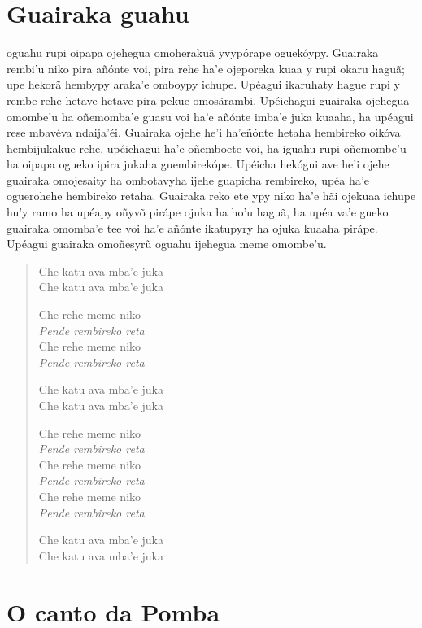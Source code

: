 \chapter{Guairaka guahu}

 oguahu rupi oipapa ojehegua omoherakuã yvypórape oguekóypy.
Guairaka rembi'u niko pira añónte voi, pira rehe ha'e ojeporeka kuaa y
rupi okaru haguã; upe hekorã hembypy araka'e omboypy ichupe. Upéagui
ikaruhaty hague rupi y rembe rehe hetave hetave pira pekue omosãrambi.
Upéichagui guairaka ojehegua omombe'u ha oñemomba'e guasu voi ha'e
añónte imba'e juka kuaaha, ha upéagui rese mbavéva ndaija'éi. Guairaka
ojehe he'i ha'eñónte hetaha hembireko oikóva hembijukakue rehe,
upéichagui ha'e oñemboete voi, ha iguahu rupi oñemombe'u ha oipapa
ogueko ipira jukaha guembirekópe. Upéicha hekógui ave he'i ojehe
guairaka omojesaity ha ombotavyha ijehe guapicha rembireko, upéa ha'e
oguerohehe hembireko retaha. Guairaka reko ete ypy niko ha'e hãi ojekuaa
ichupe hu'y ramo ha upéapy oñyvõ pirápe ojuka ha ho'u haguã, ha upéa
va'e gueko guairaka omomba'e tee voi ha'e añónte ikatupyry ha ojuka
kuaaha pirápe. Upéagui guairaka omoñesyrũ oguahu ijehegua meme omombe'u.

\begin{verse}
Che katu ava mba'e juka\\
Che katu ava mba'e juka
       
Che rehe meme niko\\
\textit{Pende rembireko reta}\\
Che rehe meme niko\\
\textit{Pende rembireko reta}
       
Che katu ava mba'e juka\\
Che katu ava mba'e juka          
       
Che rehe meme niko\\
\textit{Pende rembireko reta}\\
Che rehe meme niko\\
\textit{Pende rembireko reta}\\
Che rehe meme niko\\
\textit{Pende rembireko reta}
       
Che katu ava mba'e juka\\
Che katu ava mba'e juka
\end{verse}

\chapter{O canto da Pomba}

